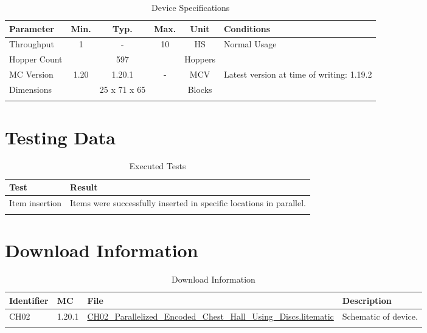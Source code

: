 \documentclass[10pt]{datasheet}
\begin{document}
\begin{table}[H]
    \caption{Device Specifications}
    \begin{tabularx}{\textwidth}{l | c c c | c | X}
        \thickhline
        \textbf{Parameter} & \textbf{Min.} & \textbf{Typ.} & \textbf{Max.} &
        \textbf{Unit} & \textbf{Conditions} \\
        \hline
        Throughput  & 1 & - & 10 & HS & Normal Usage \\
        \hline
        Hopper Count & & 597 & & Hoppers & \\
        \hline
        MC Version & 1.20 & 1.20.1 & - & MCV & Latest version at time of writing: 1.19.2\\
        \hline
        Dimensions & & 25 x 71 x 65 & & Blocks & \\
        \thickhline
\end{tabularx}
\end{table}

\section{Testing Data}

\begin{table}[H]
\caption{Executed Tests}
\begin{tabularx}{\textwidth}{l | X}
    \thickhline
    \textbf{Test} & \textbf{Result} \\
    \hline
    Item insertion & Items were successfully inserted in specific locations in parallel. \\
    \thickhline
\end{tabularx}
\end{table}

\section{Download Information}
\begin{table}[H]
    \caption{Download Information}
    \begin{tabularx}{\textwidth}{l | l | l | X}
        \thickhline
        \textbf{Identifier} & \textbf{MC} & \textbf{File} & \textbf{Description} \\
        \hline
        CH02 & 1.20.1 & \href{https://github.com/Soontech-Annals/Archive/blob/b56572c0d2b4f182d9e9d41449d8cb2963b923ae/Archive/chest-halls/CH02\%20Parallelized\%20Encoded\%20Chest\%20Hall\%20Using\%20Discs/CH02\_Parallelized\_Encoded\_Chest\_Hall\_Using\_Discs.litematic?raw=1}{CH02\_Parallelized\_Encoded\_Chest\_Hall\_Using\_Discs.litematic} & Schematic of device. \\
        \hline
        \thickhline
    \end{tabularx}
\end{table}
\end{document}

